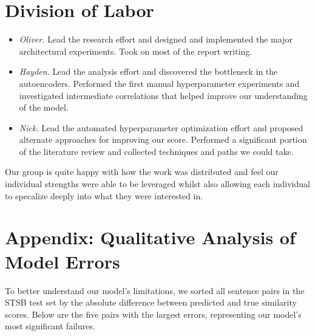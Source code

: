 \documentclass{article}
\begin{document}
\section{Division of Labor}
\begin{itemize}
    \item \textit{Oliver.}  Lead the research effort and designed and implemented the major architectural experiments. Took on most of the report writing.
    \item \textit{Hayden.} Lead the analysis effort and discovered the bottleneck in the autoencoders. Performed the first manual hyperparameter experiments and investigated intermediate correlations that helped improve our understanding of the model.
    \item \textit{Nick.}  Lead the automated hyperparameter optimization effort and proposed alternate approaches for improving our score. Performed a significant portion of the literature review and collected techniques and paths we could take.
\end{itemize}
Our group is quite happy with how the work was distributed and feel our individual strengths were able to be leveraged whilst also allowing each individual to specalize deeply into what they were interested in.

\newpage
\section{Appendix: Qualitative Analysis of Model Errors} \label{error analysis}
To better understand our model's limitations, we sorted all sentence pairs in the STSB test set by the absolute difference between predicted and true similarity scores. Below are the five pairs with the largest errors, representing our model's most significant failures.
\end{document}
